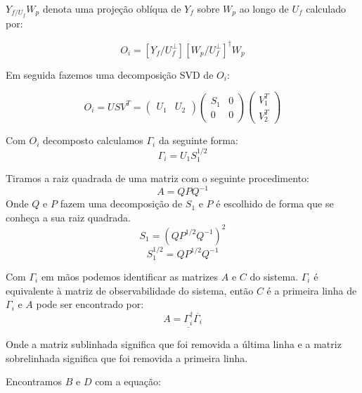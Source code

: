 $Y_{f/U_f}W_p$ denota uma projeção oblíqua de $Y_f$ sobre $W_p$ ao longo de $U_f$ calculado por:

\begin{equation}\label{eq:oiexp}
O_i=[Y_f/U_f^\perp][W_p/U_f^\perp]^\dagger W_p
\end{equation}

Em seguida fazemos uma decomposição SVD de $O_i$:

\begin{equation}\label{eq:svd}
O_i=USV^T=\begin{pmatrix}
U_1 &U_2
\end{pmatrix}\begin{pmatrix}
S_1 & 0\\ 0 & 0
\end{pmatrix} 
\begin{pmatrix}
V_1^T \\ V_2^T
\end{pmatrix}
\end{equation}

Com $O_i$ decomposto calculamos $\Gamma_i$ da seguinte forma:
\begin{equation}\label{eq:gammai}
\Gamma_i=U_1 S_1^{1/2}
\end{equation}

Tiramos a raiz quadrada de uma matriz com o seguinte procedimento:
\begin{equation}
A=QPQ^{-1}
\end{equation}
Onde $Q$ e $P$ fazem uma decomposição de $S_1$ e $P$ é escolhido de forma que se conheça a sua raiz quadrada.
\begin{equation}
S_1=(QP^{1/2}Q^{-1})^2
\end{equation}
\begin{equation} \label{eq:raizs1}
S_1^{1/2}=QP^{1/2}Q^{-1}
\end{equation}

Com $\Gamma_i$ em mãos podemos identificar as matrizes $A$ e $C$ do sistema. $\Gamma_i$ é equivalente à matriz de observabilidade do sistema, então $C$ é a primeira linha de $\Gamma_i$ e $A$ pode ser encontrado por:
\begin{equation}\label{eq:matriza}
A=\underline{\Gamma_i^\dagger}\overline{\Gamma_i}
\end{equation}

Onde a matriz sublinhada significa que foi removida a última linha e a matriz sobrelinhada significa que foi removida a primeira linha.


Encontramos $B$ e $D$ com a equação:


